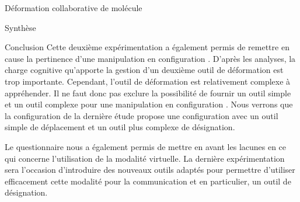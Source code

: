 \documentclass[myfrancais,ngerman,english,frenchb]{mythesis}
\begin{document}
\begin{mychapter}{Déformation collaborative de molécule}
\begin{mysection}{Synthèse}
\begin{mysubsection}{Conclusion}
				Cette deuxième expérimentation a également permis de remettre en cause la pertinence d'une manipulation en configuration .
				D'après les analyses, la charge cognitive qu'apporte la gestion d'un deuxième outil de déformation est trop importante.
				Cependant, l'outil de déformation est relativement complexe à appréhender.
				Il ne faut donc pas exclure la possibilité de fournir un outil simple et un outil complexe pour une manipulation en configuration .
				Nous verrons que la configuration de la dernière étude  propose une configuration  avec un outil simple de déplacement et un outil plus complexe de désignation.

				Le questionnaire nous a également permis de mettre en avant les lacunes en ce qui concerne l'utilisation de la modalité virtuelle.
				La dernière expérimentation sera l'occasion d'introduire des nouveaux outils adaptés pour permettre d'utiliser efficacement cette modalité pour la communication et en particulier, un outil de désignation.
			\end{mysubsection}
		\end{mysection}
	\end{mychapter}
\end{document}
